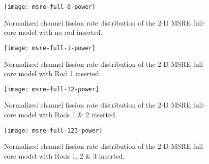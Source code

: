 \begin{figure}[htb!]
  \centering
  \texttt{[image: msre-full-0-power]}
  \caption{Normalized channel fission rate distribution of the 2-D \gls{MSRE} full-core model with
  no rod inserted.}
  \label{fig:0-rod}
\end{figure}

\begin{figure}[htb!]
  \centering
  \texttt{[image: msre-full-1-power]}
  \caption{Normalized channel fission rate distribution of the 2-D \gls{MSRE} full-core model with
  Rod 1 inserted.}
  \label{fig:1-rod}
\end{figure}

\begin{figure}[htb!]
  \centering
  \texttt{[image: msre-full-12-power]}
  \caption{Normalized channel fission rate distribution of the 2-D \gls{MSRE} full-core model with
  Rods 1 \& 2 inserted.}
  \label{fig:12-rod}
\end{figure}

\begin{figure}[htb!]
  \centering
  \texttt{[image: msre-full-123-power]}
  \caption{Normalized channel fission rate distribution of the 2-D \gls{MSRE} full-core model with
  Rods 1, 2 \& 3 inserted.}
  \label{fig:123-rod}
\end{figure}

